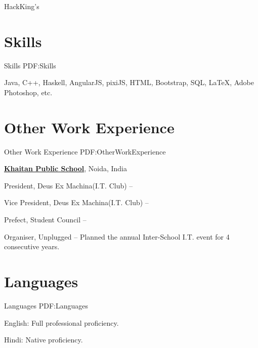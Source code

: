 \documentclass[letterpaper,10pt,oneside]{article}
\begin{document}
\begin{body}
\BulletItem
HackKing's
\hfill
{}


\section
{Skills}
{Skills}
{PDF:Skills}

Java,
C++,
Haskell,
\newline
AngularJS,
pixiJS,
HTML,
Bootstrap,
SQL,
\newline
{\LaTeX},
Adobe Photoshop, etc.


\section
{Other Work\newline
Experience}
{Other Work Experience}
{PDF:OtherWorkExperience}

\href{http://www.thekhaitanschool.org}
{\textbf{Khaitan Public School}},
Noida, India

\GapNoBreak
\BulletItem
President,
Deus Ex Machina(I.T. Club)
\hfill
{} --

\GapNoBreak

\BulletItem
Vice President,
Deus Ex Machina(I.T. Club)
\hfill
{} --

\GapNoBreak

\BulletItem
Prefect,
Student Council
\hfill
{} --

\GapNoBreak

\BulletItem
Organiser,
Unplugged
\hfill
{} --
\GapNoBreak
\SubBulletItem
Planned the annual Inter-School I.T. event for 4 consecutive years.



\section
{Languages}
{Languages}
{PDF:Languages}

\BulletItem
English: Full professional proficiency.

\GapNoBreak
\BulletItem
Hindi: Native proficiency.


\end{body}
\end{document}
